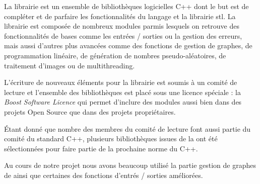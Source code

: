 
%


\par
La librairie \boost  est un ensemble de biblioth\`eques logicielles C++ dont le but est de compléter et de parfaire les fonctionnalités du langage et la librairie stl. La librairie \boost est compos\'ee de nombreux modules parmis lesquels on retrouve des fonctionnalit\'es de bases comme les entr\'ees / sorties ou la gestion des erreurs, mais aussi d'autres plus avanc\'ees comme des fonctions de gestion de graphes, de programmation lin\'eaire, de g\'en\'eration de nombres pseudo-al\'eatoires, de traitement d'images ou de multithreading.
\par
L'\'ecriture de nouveaux \'el\'ements pour la librairie \boost est soumis \`a un  comit\'e de lecture et l'ensemble des biblioth\`eques est plac\'e sous une licence sp\'eciale : la \textit{Boost Software Licence} qui permet d'inclure des modules \boost aussi bien dans des projets Open Source que dans des projets propri\'etaires.
\par
\'Etant donn\'e que nombre des membres du comit\'e de lecture font aussi partie du comit\'e du standard C++, plusieurs biblioth\`eques issues de la \boost ont \'et\'e s\'electionn\'ees pour faire partie de la prochaine norme du C++.
\par
Au cours de notre projet nous avons beaucoup utilis\'e la partie gestion de graphes de \boost ainsi que certaines des fonctions d'entr\'es / sorties am\'elior\'ees.
%
